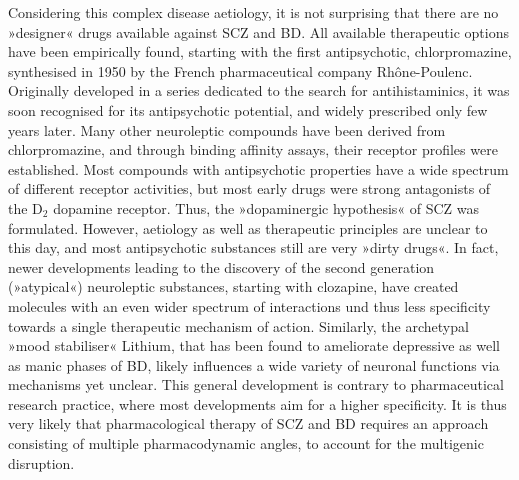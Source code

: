 Considering this complex disease aetiology, it is not surprising that there are no »designer« drugs available against SCZ and BD. All available therapeutic options have been empirically found, starting with the first antipsychotic, chlorpromazine, synthesised in 1950 by the French pharmaceutical company Rhône-Poulenc. Originally developed in a series dedicated to the search for antihistaminics, it was soon recognised for its antipsychotic potential, and widely prescribed only few years later. Many other neuroleptic compounds have been derived from chlorpromazine, and through binding affinity assays, their receptor profiles were established. Most compounds with antipsychotic properties have a wide spectrum of different receptor activities, but most early drugs were strong antagonists of the D$_2$ dopamine receptor. Thus, the »dopaminergic hypothesis« of SCZ was formulated. However, aetiology as well as therapeutic principles are unclear to this day, and most antipsychotic substances still are very »dirty drugs«. In fact, newer developments leading to the discovery of the second generation (»atypical«) neuroleptic substances, starting with clozapine, have created molecules with an even wider spectrum of interactions und thus less specificity towards a single therapeutic mechanism of action. Similarly, the archetypal »mood stabiliser« Lithium, that has been found to ameliorate depressive as well as manic phases of BD, likely influences a wide variety of neuronal functions via mechanisms yet unclear\cite{Malhi2013}. This general development is contrary to pharmaceutical research practice, where most developments aim for a higher specificity. It is thus very likely that pharmacological therapy of SCZ and BD requires an approach consisting of multiple pharmacodynamic angles, to account for the multigenic disruption.

